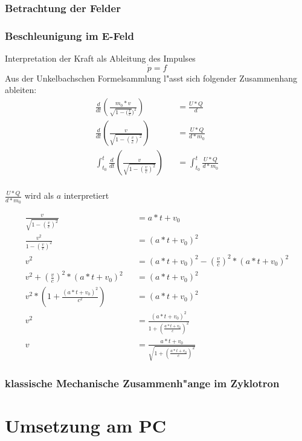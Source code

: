 \documentclass[14pt, a4paper]{report}
\begin{document}
\section{Betrachtung der Felder}
\section{Beschleunigung im E-Feld}
Interpretation der Kraft als Ableitung des Impulses
\begin{equation}
\dot{p} = f 
\end{equation}
Aus der Unkelbachschen Formelsammlung l"asst sich folgender Zusammenhang ableiten:
\begin{eqnarray}
\frac{d}{dt} (\frac{m_0 * v}{\sqrt{1 - (\frac{v}{c}})^2}) && = \frac{U * Q}{d} \\
\frac{d}{dt} (\frac{v}{\sqrt{1 - (\frac{v}{c})^2}}) && = \frac{U * Q}{d * m_0} \\
\int_{t_0}^t \frac{d}{dt} (\frac{v}{\sqrt{1 - (\frac{v}{c})^2}}) 
    && = \int_{t_0}^t \frac{U * Q}{d * m_0} \\
\end{eqnarray}
\begin{center}
$ \frac{U * Q}{d * m_0} $ wird als $ a $ interpretiert
\end{center}
\begin{eqnarray}
\frac{v}{\sqrt{1 - (\frac{v}{c})^2}} && = a * t + v_0 \\
\frac{v^2}{1 - (\frac{v}{c})^2} && = (a * t + v_0 )^2 \\
v^2  && = (a * t + v_0)^2 - (\frac{v}{c})^2 * (a * t + v_0)^2\\
v^2 + (\frac{v}{c})^2 * (a * t + v_0)^2 && = (a * t + v_0)^2 \\
v^2 * (1 + \frac{(a * t + v_0)^2}{c^2}) &&  = (a * t + v_0)^2 \\
v^2 && = \frac{(a * t + v_0)^2}{1 + (\frac{a * t + v_0}{c})^2} \\ 
v && = \frac{a * t + v_0}{\sqrt{1 + (\frac{a * t + v_0}{c})^2}}
\end{eqnarray}
\section{klassische Mechanische Zusammenh"ange im Zyklotron}





\part{Umsetzung am PC}
\end{document}
